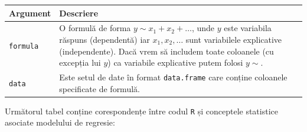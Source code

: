 \documentclass[]{article}
\begin{document}
\begin{longtable}[]{@{}ll@{}}
\toprule
\begin{minipage}[b]{0.18\columnwidth}\raggedright\strut
Argument\strut
\end{minipage} & \begin{minipage}[b]{0.67\columnwidth}\raggedright\strut
Descriere\strut
\end{minipage}\tabularnewline
\midrule
\endhead
\begin{minipage}[t]{0.18\columnwidth}\raggedright\strut
\texttt{formula}\strut
\end{minipage} & \begin{minipage}[t]{0.67\columnwidth}\raggedright\strut
O formulă de forma \(y \sim x_1 + x_2 + \ldots\), unde \(y\) este
variabila răspuns (dependentă) iar \(x_1,x_2,\ldots\) sunt variabilele
explicative (independente). Dacă vrem să includem toate coloanele (cu
excepția lui \(y\)) ca variabile explicative putem folosi
\(y \sim .\)\strut
\end{minipage}\tabularnewline
\begin{minipage}[t]{0.18\columnwidth}\raggedright\strut
\texttt{data}\strut
\end{minipage} & \begin{minipage}[t]{0.67\columnwidth}\raggedright\strut
Este setul de date în format \texttt{data.frame} care conține coloanele
specificate de formulă.\strut
\end{minipage}\tabularnewline
\bottomrule
\end{longtable}

Următorul tabel conține corespondențe între codul \texttt{R} și
conceptele statistice asociate modelului de regresie:
\end{document}
